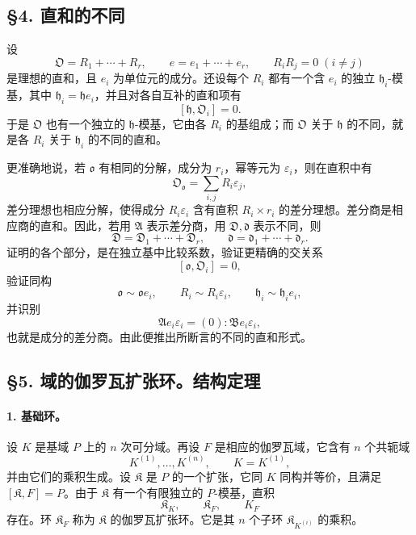 \subsection*{§4. 直和的不同}

设
\[
        \mathfrak O=R_1+\cdots+R_r,
        \qquad
        e=e_1+\cdots+e_r,
        \qquad R_iR_j=0\;(i\ne j)
\]
是理想的直和，且 \(e_i\) 为单位元的成分。还设每个 \(R_i\) 都有一个含 \(e_i\) 的独立 \(\mathfrak h_i\)-模基，其中 \(\mathfrak h_i=\mathfrak h e_i\)，并且对各自互补的直和项有
\[
        [\mathfrak h,\mathfrak O_i]=0.
\]
于是 \(\mathfrak O\) 也有一个独立的 \(\mathfrak h\)-模基，它由各 \(R_i\) 的基组成；而 \(\mathfrak O\) 关于 \(\mathfrak h\) 的不同，就是各 \(R_i\) 关于 \(\mathfrak h_i\) 的不同的直和。

更准确地说，若 \(\mathfrak o\) 有相同的分解，成分为 \(r_i\)，幂等元为 \(\varepsilon_i\)，则在直积中有
\[
        \mathfrak O_{\mathfrak o}=\sum_{i,j} R_i\varepsilon_j,
\]
差分理想也相应分解，使得成分 \(R_i\varepsilon_i\) 含有直积 \(R_i\times r_i\) 的差分理想。差分商是相应商的直和。因此，若用 \(\mathfrak A\) 表示差分商，用 \(\mathfrak D,\mathfrak d\) 表示不同，则
\[
        \mathfrak D=\mathfrak D_1+\cdots+\mathfrak D_r,
        \qquad
        \mathfrak d=\mathfrak d_1+
        \cdots+\mathfrak d_r.
\]
证明的各个部分，是在独立基中比较系数，验证更精确的交关系
\[
        [\mathfrak o,\mathfrak O_i]=0,
\]
验证同构
\[
        \mathfrak o\sim\mathfrak o e_i,
        \qquad
        R_i\sim R_i\varepsilon_i,
        \qquad
        \mathfrak h_i\sim \mathfrak h_i e_i,
\]
并识别
\[
        \mathfrak A e_i\varepsilon_i=(0):\mathfrak B e_i\varepsilon_i,
\]
也就是成分的差分商。由此便推出所断言的不同的直和形式。

\subsection*{§5. 域的伽罗瓦扩张环。结构定理}

\paragraph{1. 基础环。}
设 \(K\) 是基域 \(P\) 上的 \(n\) 次可分域。再设 \(F\) 是相应的伽罗瓦域，它含有 \(n\) 个共轭域
\[
        K^{(1)},\ldots,K^{(n)},\qquad K=K^{(1)},
\]
并由它们的乘积生成。设 \(\mathfrak K\) 是 \(P\) 的一个扩张，它同 \(K\) 同构并等价，且满足 \([\mathfrak K,F]=P\)。由于 \(\mathfrak K\) 有一个有限独立的 \(P\)-模基，直积
\[
        \mathfrak K_K,
        \qquad \mathfrak K_F,
        \qquad K_F
\]
存在。环 \(\mathfrak K_F\) 称为 \(\mathfrak K\) 的伽罗瓦扩张环。它是其 \(n\) 个子环 \(\mathfrak K_{K^{(i)}}\) 的乘积。

